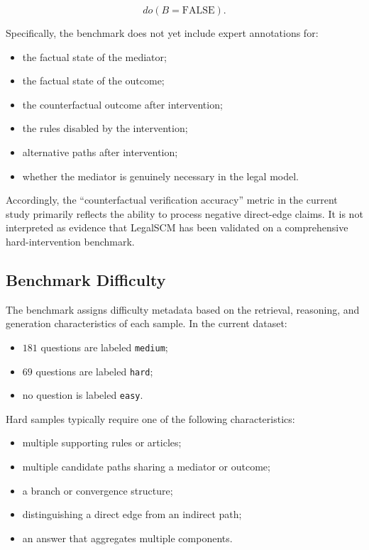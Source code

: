 \[
do(B=\mathrm{FALSE}).
\]

Specifically, the benchmark does not yet include expert annotations for:

\begin{itemize}
    \item the factual state of the mediator;
    \item the factual state of the outcome;
    \item the counterfactual outcome after intervention;
    \item the rules disabled by the intervention;
    \item alternative paths after intervention;
    \item whether the mediator is genuinely necessary in the legal model.
\end{itemize}

Accordingly, the ``counterfactual verification accuracy'' metric in the
current study primarily reflects the ability to process negative direct-edge
claims. It is not interpreted as evidence that LegalSCM has been validated on
a comprehensive hard-intervention benchmark.

\subsection{Benchmark Difficulty}

The benchmark assigns difficulty metadata based on the retrieval, reasoning,
and generation characteristics of each sample. In the current dataset:

\begin{itemize}
    \item \(181\) questions are labeled \texttt{medium};
    \item \(69\) questions are labeled \texttt{hard};
    \item no question is labeled \texttt{easy}.
\end{itemize}

Hard samples typically require one of the following characteristics:

\begin{itemize}
    \item multiple supporting rules or articles;
    \item multiple candidate paths sharing a mediator or outcome;
    \item a branch or convergence structure;
    \item distinguishing a direct edge from an indirect path;
    \item an answer that aggregates multiple components.
\end{itemize}

